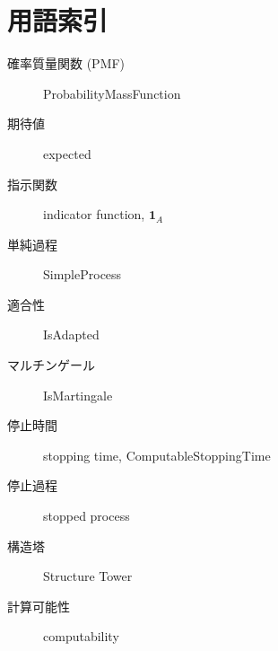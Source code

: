 \documentclass[a4paper,12pt]{ltjsarticle}
\theoremstyle{definition}
\begin{document}
\section{用語索引}

\begin{description}
\item[確率質量関数 (PMF)] ProbabilityMassFunction
\item[期待値] expected
\item[指示関数] indicator function, $\mathbf{1}_A$
\item[単純過程] SimpleProcess
\item[適合性] IsAdapted
\item[マルチンゲール] IsMartingale
\item[停止時間] stopping time, ComputableStoppingTime
\item[停止過程] stopped process
\item[構造塔] Structure Tower
\item[計算可能性] computability
\end{description}
\end{document}

